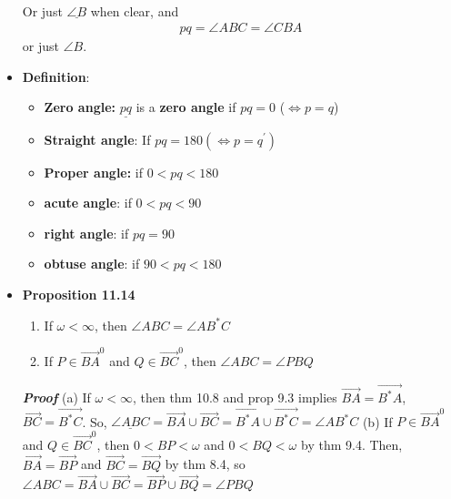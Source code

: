 \documentclass{report}
\begin{document}
\begin{itemize}
\begin{align*}
                \end{align*}
                Or just $\underline{\angle B}$ when clear, and
                \begin{align*}
                    pq = \angle ABC = \angle CBA
                \end{align*}
                or just $\angle B$.
                \bigbreak \noindent 
                \begin{figure}[ht]
                    \centering
                    \label{fig:im}
                \end{figure}
            \item \textbf{Definition}: 
                \begin{itemize}
                    \item \textbf{Zero angle:} $\underline{pq}$ is a \textbf{zero angle} if $pq = 0 $ ($\iff p = q$)
                    \item \textbf{Straight angle}: If $pq = 180 (\iff p = q^{\prime}) $
                    \item \textbf{Proper angle:} if $0 < pq < 180 $
                    \item \textbf{acute angle}: if $ 0 < pq < 90$
                    \item \textbf{right angle}: if $ pq = 90$
                    \item \textbf{obtuse angle}: if $ 90 < pq < 180$
                \end{itemize}
            \item \textbf{Proposition 11.14}
                \begin{enumerate}[label=(\alph*)]
                    \item If $\omega < \infty$, then $\angle ABC = \angle AB^{*}C$
                    \item If $P \in \overrightarrow{BA}^{0} $ and $Q \in \overrightarrow{BC}^{0} $, then $\angle ABC = \angle PBQ$
                        \bigbreak \noindent 
                \end{enumerate}
                \bigbreak \noindent 
                \textbf{\textit{Proof}} (a) If $\omega < \infty$, then thm 10.8 and prop 9.3 implies $\overrightarrow{BA} = \overrightarrow{B^{*}A} $, $\overrightarrow{BC} = \overrightarrow{B^{*}C} $. So, $\underline{\angle ABC} = \overrightarrow{BA} \cup \overrightarrow{BC} = \overrightarrow{B^{*}A} \cup \overrightarrow{B^{*}C} = \angle AB^{*}C$ 
                \bigbreak \noindent 
                (b) If $P \in \overrightarrow{BA}^{0}$ and $Q \in \overrightarrow{BC}^{0}$, then $0 < BP < \omega$ and $0 < BQ < \omega$ by thm 9.4. Then, $ \overrightarrow{BA} = \overrightarrow{BP} $ and $\overrightarrow{BC} = \overrightarrow{BQ} $ by thm 8.4, so $\angle ABC = \overrightarrow{BA} \cup \overrightarrow{BC}  = \overrightarrow{BP} \cup \overrightarrow{BQ} = \angle PBQ$

\end{itemize}
\end{document}
